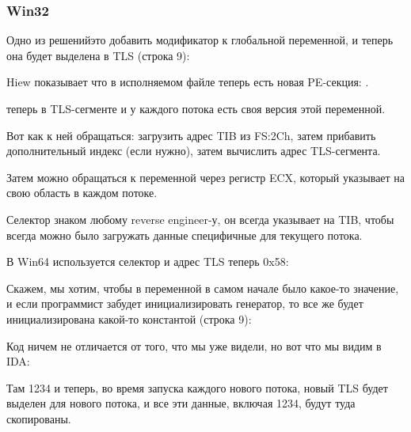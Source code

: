 \subsubsection{Win32}


Одно из решений\EMDASH{}это добавить модификатор  к глобальной переменной, 
и теперь она будет выделена в \ac{TLS} (строка 9):



Hiew показывает что в исполняемом файле теперь есть новая PE-секция: .



 теперь в \ac{TLS}-сегменте и у каждого потока есть своя версия этой переменной.

Вот как к ней обращаться: загрузить адрес \ac{TIB} из FS:2Ch, затем прибавить дополнительный индекс 
(если нужно), затем вычислить адрес \ac{TLS}-сегмента.

Затем можно обращаться к переменной  через регистр ECX, который указывает на свою
область в каждом потоке.

Селектор  знаком любому reverse engineer-у, он всегда указывает на \ac{TIB}, чтобы всегда можно было
загружать данные специфичные для текущего потока.

В Win64 используется селектор  и адрес \ac{TLS} теперь 0x58:




Скажем, мы хотим, чтобы в переменной  в самом начале было какое-то значение, 
и если программист забудет инициализировать генератор, то  все же будет инициализирована какой-то
константой (строка 9):



Код ничем не отличается от того, что мы уже видели, но вот что мы видим в IDA:



Там 1234 и теперь, во время запуска каждого нового потока, новый \ac{TLS} будет выделен для нового потока,
и все эти данные, включая 1234, будут туда скопированы.

